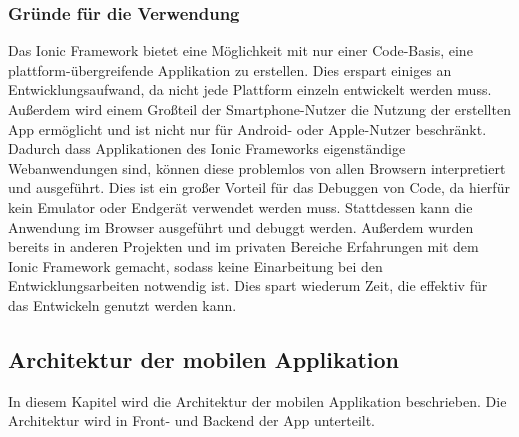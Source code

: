 \subsubsection{Gründe für die Verwendung}
Das Ionic Framework bietet eine Möglichkeit mit nur einer Code-Basis, eine plattform-übergreifende Applikation zu erstellen. Dies erspart einiges an Entwicklungsaufwand, da nicht jede Plattform einzeln entwickelt werden muss. Außerdem wird einem Großteil der Smartphone-Nutzer die Nutzung der erstellten App ermöglicht und ist nicht nur für Android- oder Apple-Nutzer beschränkt. \newline
Dadurch dass Applikationen des Ionic Frameworks eigenständige Webanwendungen sind, können diese problemlos von allen Browsern interpretiert und ausgeführt. Dies ist ein großer Vorteil für das Debuggen von Code, da hierfür kein Emulator oder Endgerät verwendet werden muss. Stattdessen kann die Anwendung im Browser ausgeführt und debuggt werden. \newline
Außerdem wurden bereits in anderen Projekten und im privaten Bereiche Erfahrungen mit dem Ionic Framework gemacht, sodass keine Einarbeitung bei den Entwicklungsarbeiten notwendig ist. Dies spart wiederum Zeit, die effektiv für das Entwickeln genutzt werden kann. 
\subsection{Architektur der mobilen Applikation}
In diesem Kapitel wird die Architektur der mobilen Applikation beschrieben. Die Architektur wird in Front- und Backend der App unterteilt.
